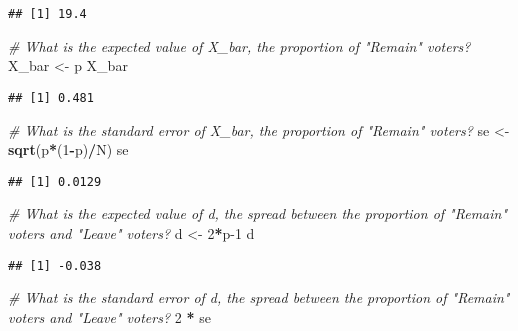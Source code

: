 \documentclass[
]{article}
\newenvironment{Shaded}{\begin{snugshade}}{\end{snugshade}}
\newcommand{\CommentTok}[1]{\textcolor[rgb]{0.56,0.35,0.01}{\textit{#1}}}
\newcommand{\DecValTok}[1]{\textcolor[rgb]{0.00,0.00,0.81}{#1}}
\newcommand{\KeywordTok}[1]{\textcolor[rgb]{0.13,0.29,0.53}{\textbf{#1}}}
\newcommand{\NormalTok}[1]{#1}
\newcommand{\OperatorTok}[1]{\textcolor[rgb]{0.81,0.36,0.00}{\textbf{#1}}}
\newcommand{\StringTok}[1]{\textcolor[rgb]{0.31,0.60,0.02}{#1}}
\begin{document}
\begin{verbatim}
## [1] 19.4
\end{verbatim}

\begin{Shaded}
\begin{Highlighting}[]
\CommentTok{\# What is the expected value of X\_bar, the proportion of "Remain" voters?}
\NormalTok{X\_bar \textless{}{-}}\StringTok{ }\NormalTok{p}
\NormalTok{X\_bar}
\end{Highlighting}
\end{Shaded}

\begin{verbatim}
## [1] 0.481
\end{verbatim}

\begin{Shaded}
\begin{Highlighting}[]
\CommentTok{\# What is the standard error of X\_bar, the proportion of "Remain" voters?}
\NormalTok{se \textless{}{-}}\StringTok{ }\KeywordTok{sqrt}\NormalTok{(p}\OperatorTok{*}\NormalTok{(}\DecValTok{1}\OperatorTok{{-}}\NormalTok{p)}\OperatorTok{/}\NormalTok{N)}
\NormalTok{se}
\end{Highlighting}
\end{Shaded}

\begin{verbatim}
## [1] 0.0129
\end{verbatim}

\begin{Shaded}
\begin{Highlighting}[]
\CommentTok{\# What is the expected value of d, the spread between the proportion of "Remain" voters and "Leave" voters?}
\NormalTok{d \textless{}{-}}\StringTok{ }\DecValTok{2}\OperatorTok{*}\NormalTok{p}\DecValTok{{-}1}
\NormalTok{d}
\end{Highlighting}
\end{Shaded}

\begin{verbatim}
## [1] -0.038
\end{verbatim}

\begin{Shaded}
\begin{Highlighting}[]
\CommentTok{\# What is the standard error of d, the spread between the proportion of "Remain" voters and "Leave" voters?}
\DecValTok{2} \OperatorTok{*}\StringTok{ }\NormalTok{se}
\end{Highlighting}
\end{Shaded}
\end{document}
